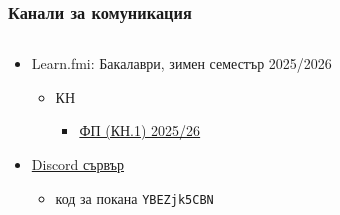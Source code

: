 \documentclass[alsotrans,beameroptions={aspectratio=169}]{beamerswitch}
\begin{document}
\begin{frame}
  \frametitle{Канали за комуникация}
          \begin{columns}[T,onlytextwidth]
            \begin{column}{.7\textwidth}
            \begin{itemize}
            \item Learn.fmi: Бакалаври, зимен семестър 2025/2026
              \begin{itemize}
              \item КН
                \begin{itemize}
                \item \href{https://learn.fmi.uni-sofia.bg/course/view.php?id=11549}{ФП (КН.1) 2025/26}
                \end{itemize}
              \end{itemize}
              \vspace{7ex}
            \item \href{https://discord.gg/YBEZjk5CBN}{Discord сървър}
              \begin{itemize}
              \item код за покана \tt{YBEZjk5CBN}
              \end{itemize}
            \end{itemize}
          \end{column}
          \begin{column}{.3\textwidth}

            \vspace{4ex}
          \end{column}
          \end{columns}
        \end{frame}
\end{document}
